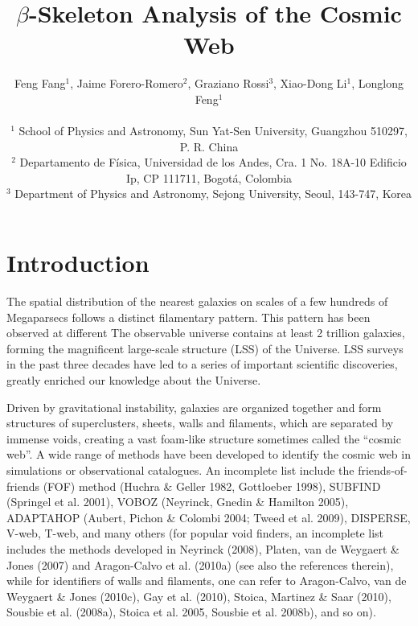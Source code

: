 \documentclass[useAMS,usenatbib]{mnras}
\begin{document}
\title[$\beta$-Skeleton Analysis]{$\beta$-Skeleton Analysis of the Cosmic Web}

\author[Fang, Forero-Romero, Rossi, Li \& Feng (2018)]
{Feng Fang$^1$, Jaime Forero-Romero$^2$, Graziano Rossi$^3$, Xiao-Dong Li$^1$, Longlong Feng$^1$ \\ \\
$^1$ School of Physics and Astronomy, Sun Yat-Sen University, Guangzhou 510297, P. R. China \\
$^2$ Departamento de F{\'i}sica, Universidad de los Andes, Cra. 1 No. 18A-10 Edificio Ip, CP 111711, Bogot{\'a}, Colombia \\
$^3$ Department of Physics and Astronomy, Sejong University, Seoul, 143-747, Korea}

\pagerange{\pageref{firstpage}--\pageref{lastpage}} 
\maketitle
\label{firstpage}


 

\section{Introduction}

The spatial distribution of the nearest galaxies on scales of a few
hundreds of Megaparsecs follows a distinct filamentary pattern.
This pattern has been observed at different 
The observable universe contains at least 2 trillion galaxies,
forming the magnificent large-scale structure (LSS) of the Universe.  
LSS surveys in the past three decades have led to a series of
important scientific discoveries,  greatly enriched our knowledge
about the Universe. 


Driven by gravitational instability, galaxies are organized together and form structures of superclusters, 
sheets, walls and filaments, which are separated by immense voids, 
creating a vast foam-like structure sometimes called the ``cosmic web''. 
A wide range of methods have been developed to identify the cosmic web in simulations or observational catalogues. 
An incomplete list include the friends-of-friends (FOF) method (Huchra \& Geller 1982, Gottloeber 1998), 
SUBFIND (Springel et al. 2001), VOBOZ (Neyrinck, Gnedin \& Hamilton 2005), 
ADAPTAHOP (Aubert, Pichon \& Colombi 2004; Tweed et al. 2009), 
DISPERSE, V-web, T-web, 
and many others 
(for popular void finders, an incomplete list includes the methods developed in Neyrinck (2008), Platen, van de Weygaert \& Jones (2007) 
and Aragon-Calvo et al. (2010a) (see also the references therein), 
while for identifiers of walls and filaments, one can refer to Aragon-Calvo, van de Weygaert \& Jones (2010c), 
Gay et al. (2010), Stoica, Martinez \& Saar (2010), Sousbie et al. (2008a), Stoica et al. 2005, Sousbie et al. 2008b), and so on).
\end{document}
